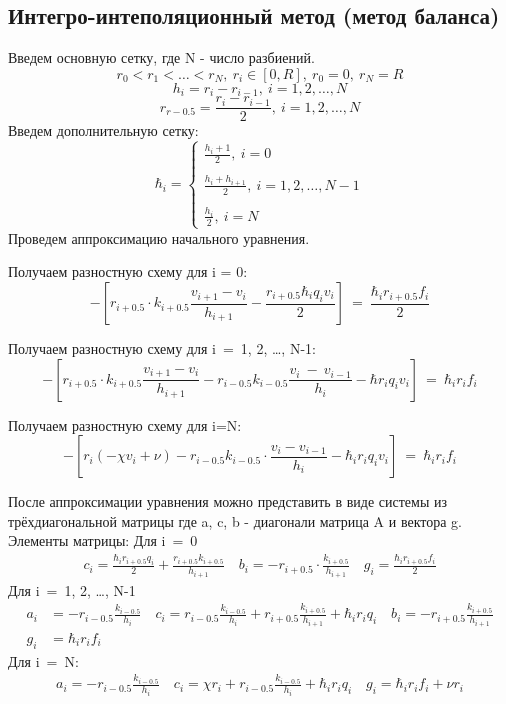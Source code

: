 \subsection{Интегро-интеполяционный метод (метод баланса)}

Введем основную сетку, где N - число разбиений.
\[r_0 < r_1 < \dots < r_N,\ r_i \in [0, R],\ r_0 = 0,\ r_N = R\]
\[
  h_i =r_i - r_{i-1},\ i=1,2, \dots, N
\]
\[
  r_{r-0.5} = \frac{r_i - r_{i-1}}{2},\ i=1,2, \dots, N
\]
Введем дополнительную сетку:
\[
  \hbar_i = \begin{cases}
    \frac{h_i + 1}{2},\ i = 0 \\ \\
    \frac{h_i + h_{i+1}}{2},\ i = 1, 2, \dots, N-1 \\ \\
    \frac{h_i}{2},\ i = N
  \end{cases}
\]
Проведем аппроксимацию начального уравнения.

Получаем разностную схему для i = 0:
\[
  -\left[ r_{i+0.5} \cdot k_{i+0.5}\frac{v_{i+1}-v_i}{h_{i+1}} - \frac{r_{i+0.5} \hbar_i q_i v_i}{2} \right]\ =\ \frac{\hbar_i r_{i+0.5} f_i}{2}
\]

Получаем разностную схему для i\ =\ 1, 2, \dots, N-1:
\[
  -\left[ r_{i+0.5} \cdot k_{i+0.5}\frac{v_{i+1}-v_i}{h_{i+1}} - r_{i-0.5}k_{i-0.5}\frac{v_{i}\ -\ v_{i-1}}{h_{i}} - \hbar r_i q_i v_i\right]\ =\ \hbar_ir_if_i
\]

Получаем разностную схему для i=N:
\[
  -\left[ r_i (-\chi v_i + \nu) - r_{i-0.5}k_{i-0.5} \cdot \frac{v_i-v_{i-1}}{h_i}- \hbar_ir_iq_iv_i \right]\ =\ \hbar_ir_if_i
\]

После аппроксимации уравнения можно представить в виде системы из трёхдиагональной матрицы где a, c, b - диагонали матрица A и вектора g. Элементы матрицы:\newline
Для i\ =\ 0
\begin{align*}
  c_i = \frac{\hbar_i r_{i+0.5} q_i}{2} + \frac{r_{i+0.5} k_{i+0.5}}{h_{i+1}} \quad
  b_i = -r_{i+0.5} \cdot \frac{k_{i+0.5}}{h_{i+1}} \quad
  g_i = \frac{\hbar_i r_{i+0.5} f_i}{2}
\end{align*}
Для i\ =\ 1, 2, \dots, N-1
\begin{align*}
  a_i &= -r_{i-0.5}\frac{k_{i-0.5}}{h_i} \quad
  c_i = r_{i-0.5}\frac{k_{i-0.5}}{h_i} + r_{i+0.5}\frac{k_{i+0.5}}{h_{i+1}} + \hbar_i r_iq_i \quad
  b_i = -r_{i+0.5}\frac{k_{i+0.5}}{h_{i+1}} \\
  g_i &= \hbar_i r_i f_i
\end{align*}
Для i\ =\ N:
\begin{align*}
  a_i = -r_{i-0.5}\frac{k_{i-0.5}}{h_i} \quad
  c_i = \chi r_i + r_{i-0.5}\frac{k_{i-0.5}}{h_i} + \hbar_i r_iq_i \quad
  g_i = \hbar_i r_i f_i + \nu r_i
\end{align*}
